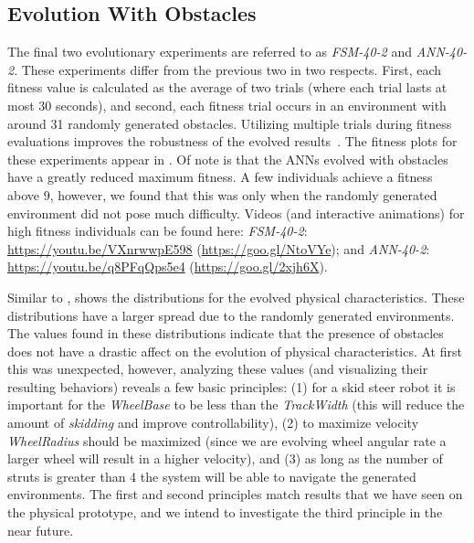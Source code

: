 \subsection{Evolution With Obstacles}



The final two evolutionary experiments are referred to as \emph{FSM-40-2} and \emph{ANN-40-2}.
%
These experiments differ from the previous two in two respects. First, each fitness value is calculated as the average of two trials (where each trial lasts at most 30 seconds), and second, each fitness trial occurs in an environment with around 31 randomly generated obstacles.
%
Utilizing multiple trials during fitness evaluations improves the robustness of the evolved results~\citep{Ruud.SSCI.EvoLearn.2016}.
%
The fitness plots for these experiments appear in .
%
Of note is that the ANNs evolved with obstacles have a greatly reduced maximum fitness. A few individuals achieve a fitness above 9, however, we found that this was only when the randomly generated environment did not pose much difficulty.
%
Videos (and interactive animations) for high fitness individuals can be found here: \emph{FSM-40-2}: \url{https://youtu.be/VXnrwwpE598} (\url{https://goo.gl/NtoVYe}); and \emph{ANN-40-2}: \url{https://youtu.be/q8PFqQps5e4} (\url{https://goo.gl/2xjh6X}).
%


Similar to ,  shows the distributions for the evolved physical characteristics.
%
These distributions have a larger spread due to the randomly generated environments.
%
The values found in these distributions indicate that the presence of obstacles does not have a drastic affect on the evolution of physical characteristics.
%
At first this was unexpected, however, analyzing these values (and visualizing their resulting behaviors) reveals a few basic principles:
(1) for a skid steer robot it is important for the \emph{WheelBase} to be less than the \emph{TrackWidth} (this will reduce the amount of \emph{skidding} and improve controllability),
(2) to maximize velocity \emph{WheelRadius} should be maximized (since we are evolving wheel angular rate a larger wheel will result in a higher velocity), and
(3) as long as the number of struts is greater than 4 the system will be able to navigate the generated environments.
%
The first and second principles match results that we have seen on the physical prototype, and we intend to investigate the third principle in the near future.
%


